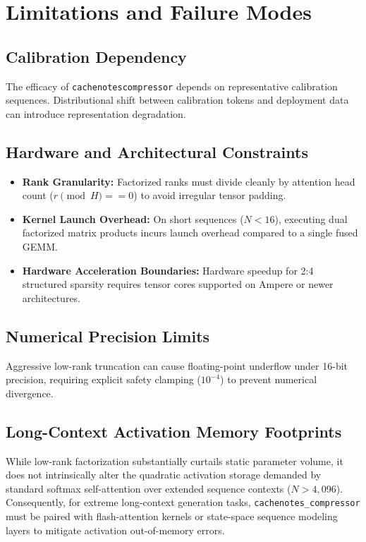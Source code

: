 \section{Limitations and Failure Modes}

\subsection{Calibration Dependency}
The efficacy of \texttt{cachenotescompressor} depends on representative calibration sequences. Distributional shift between calibration tokens and deployment data can introduce representation degradation.

\subsection{Hardware and Architectural Constraints}
\begin{itemize}
\item \textbf{Rank Granularity:} Factorized ranks must divide cleanly by attention head count ($r \pmod H == 0$) to avoid irregular tensor padding.
\item \textbf{Kernel Launch Overhead:} On short sequences ($N < 16$), executing dual factorized matrix products incurs launch overhead compared to a single fused GEMM.
\item \textbf{Hardware Acceleration Boundaries:} Hardware speedup for 2:4 structured sparsity requires tensor cores supported on Ampere or newer architectures.
\end{itemize}

\subsection{Numerical Precision Limits}
Aggressive low-rank truncation can cause floating-point underflow under 16-bit precision, requiring explicit safety clamping ($10^{-4}$) to prevent numerical divergence.

\subsection{Long-Context Activation Memory Footprints}
While low-rank factorization substantially curtails static parameter volume, it does not intrinsically alter the quadratic activation storage demanded by standard softmax self-attention over extended sequence contexts ($N > 4{,}096$). Consequently, for extreme long-context generation tasks, \texttt{cachenotes\_compressor} must be paired with flash-attention kernels or state-space sequence modeling layers to mitigate activation out-of-memory errors.

